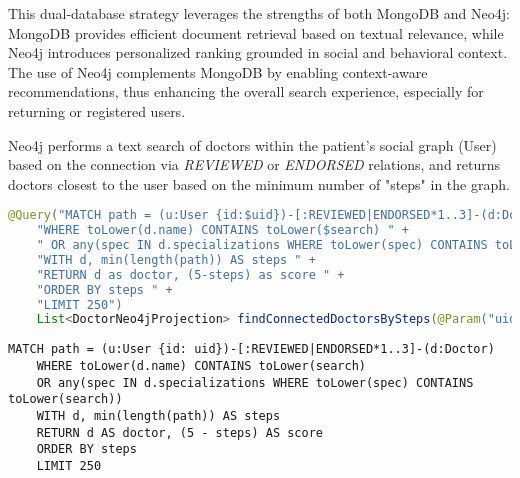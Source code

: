 This dual-database strategy leverages the strengths of both MongoDB and Neo4j: MongoDB provides efficient document retrieval based on textual relevance, while Neo4j introduces personalized ranking grounded in social and behavioral context. The use of Neo4j complements MongoDB by enabling context-aware recommendations, thus enhancing the overall search experience, especially for returning or registered users. 

Neo4j performs a text search of doctors within the patient's social graph (User) based on the connection via \textit{REVIEWED} or \textit{ENDORSED} relations, and returns doctors closest to the user based on the minimum number of "steps" in the graph.

\begin{lstlisting}[language=java]
	@Query("MATCH path = (u:User {id:$uid})-[:REVIEWED|ENDORSED*1..3]-(d:Doctor) " +
	"WHERE toLower(d.name) CONTAINS toLower($search) " +
	" OR any(spec IN d.specializations WHERE toLower(spec) CONTAINS toLower($search)) " +
	"WITH d, min(length(path)) AS steps " +
	"RETURN d as doctor, (5-steps) as score " +
	"ORDER BY steps " +
	"LIMIT 250")
	List<DoctorNeo4jProjection> findConnectedDoctorsBySteps(@Param("uid") String patientId, @Param("search") String search);
\end{lstlisting}

\begin{lstlisting}[language=cypher]
	MATCH path = (u:User {id: uid})-[:REVIEWED|ENDORSED*1..3]-(d:Doctor)
	WHERE toLower(d.name) CONTAINS toLower(search)
	OR any(spec IN d.specializations WHERE toLower(spec) CONTAINS toLower(search))
	WITH d, min(length(path)) AS steps
	RETURN d AS doctor, (5 - steps) AS score
	ORDER BY steps
	LIMIT 250
\end{lstlisting}


